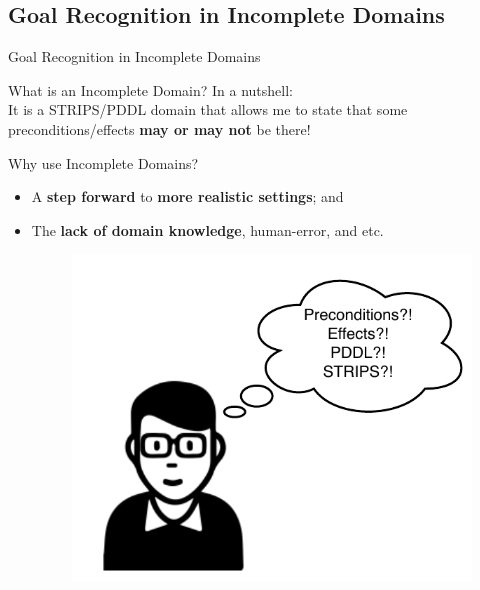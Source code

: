 \documentclass[usenames,dvipsnames]{beamer}
\begin{document}
\subsection{Goal Recognition in Incomplete Domains}

\begin{frame}[c]
	\begin{center}
		\Large{Goal Recognition in Incomplete Domains}
	\end{center}
\end{frame}

	\begin{frame}[c]{What is an Incomplete Domain?}
		In a nutshell: \\
			It is a STRIPS/PDDL domain that allows me to state that some preconditions/effects \textbf{may or may not} be there!
	\end{frame}
	
    \begin{frame}{Why use Incomplete Domains?}
       	\begin{itemize}
			\item A \textbf{step forward} to \textbf{more realistic settings}; and
			
       		\item The \textbf{lack of domain knowledge}, human-error, and etc.
			\begin{figure}[]
			 	\centering
			 	\includegraphics[width=0.8\linewidth]{fig/nerd-incomplete_domain.pdf}
			\end{figure}
		\end{itemize}
    \end{frame}
	
\end{document}
